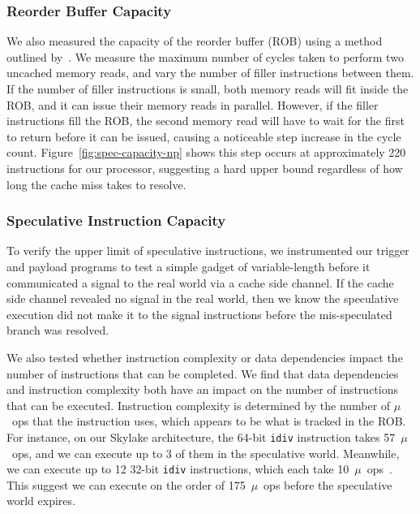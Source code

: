 \subsubsection{Reorder Buffer Capacity} \label{sssec:ROB}
We also measured the capacity of the reorder buffer (ROB) using a method
outlined by~\cite{measuring-rob}. We measure the maximum number of cycles taken
to perform two uncached memory reads, and vary the number of filler instructions
between them. If the number of filler instructions is small, both memory reads
will fit inside the ROB, and it can issue their memory reads in parallel.
However, if the filler instructions fill the ROB, the second memory read will
have to wait for the first to return before it can be issued, causing a
noticeable step increase in the cycle count. Figure~\ref{fig:spec-capacity-np}
shows this step occurs at approximately 220 instructions for our processor,
suggesting a hard upper bound regardless of how long the cache miss takes to
resolve.


\subsubsection{Speculative Instruction Capacity}

To verify the upper limit of speculative instructions, we instrumented our
trigger and payload programs to test a simple gadget of variable-length before it
communicated a signal to the real world via a cache side channel. If the cache
side channel revealed no signal in the real world, then we know the speculative
execution did not make it to the signal instructions before the mis-speculated
branch was resolved.

We also tested whether instruction complexity or data dependencies impact the
number of instructions that can be completed. We find that data dependencies and
instruction complexity both have an impact on the number of instructions that
can be executed. Instruction complexity is determined by the number of $\mu$~ops
that the instruction uses, which appears to be what is tracked in the ROB. For
instance, on our Skylake architecture, the 64-bit \texttt{idiv} instruction
takes 57~$\mu$~ops, and we can execute up to 3 of them in the speculative world.
Meanwhile, we can execute up to 12 32-bit \texttt{idiv} instructions, which each
take 10~$\mu$~ops~\cite{intel-instruction-tables}. This suggest we can execute
on the order of 175~$\mu$~ops before the speculative world expires.

